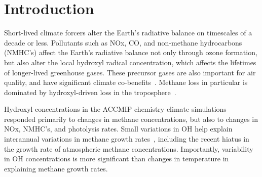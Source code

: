 \section{Introduction}



Short-lived climate forcers alter the Earth's radiative balance on timescales of a decade or less. Pollutants such as NOx, CO, and non-methane hydrocarbons (NMHC's) affect the Earth's radiative balance not only through ozone formation, but also alter the local hydroxyl radical concentration, which affects the lifetimes of longer-lived greenhouse gases. These precursor gases are also important for air quality, and have significant climate co-benefits~\citep{ref:driscoll2015}. Methane loss in particular is dominated by hydroxyl-driven loss in the troposphere~\citep{ref:kirschke2013}.


Hydroxyl concentrations in the ACCMIP chemistry climate simulations~\citep{ref:voulgarakis2013} responded primarily to changes in methane concentrations, but also to changes in NOx, NMHC's, and photolysis rates. Small variations in OH help explain interannual variations in methane growth rates~\citep{ref:mcnorton2016}, including the recent hiatus in the growth rate of atmospheric methane concentrations. Importantly, variability in OH concentrations is more significant than changes in temperature in explaining methane growth rates.


